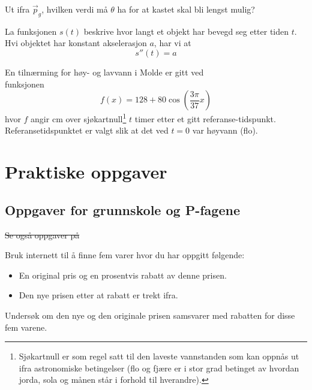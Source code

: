 Ut ifra $ \vec{p}_g $, hvilken verdi må $ \theta $ ha for at kastet skal bli lengst mulig?

La funksjonen $ s(t) $ beskrive hvor langt et objekt har bevegd seg etter tiden $ t $. Hvi objektet har konstant akselerasjon $ a $, har vi at
\[ s''(t)=a \] 
\newpage


\newpage
{}
En tilnærming for høy- og lavvann i Molde er gitt ved \\funksjonen 
\[ f(x)=128+80\cos\left(\frac{3\pi}{37}x\right) \]
hvor $ f $ angir cm over sjøkartnull\footnote{Sjøkartnull er som regel satt til den laveste vannstanden som kan oppnås ut ifra astronomiske betingelser (flo og fjære er i stor grad betinget av hvordan jorda, sola og månen står i forhold til hverandre).} $ t $ timer etter et gitt referanse-tidspunkt. Referansetidspunktet er valgt slik at det ved $ {t=0} $ var høyvann (flo). \os
{}


\section{Praktiske oppgaver}
\subsection*{Oppgaver for grunnskole og P-fagene}
\st{Se også oppgaver på }

Bruk internett til å finne fem varer hvor du har oppgitt følgende:
\begin{itemize}
	\item En original pris og en prosentvis rabatt av denne prisen.
	\item Den nye prisen etter at rabatt er trekt ifra.
\end{itemize}
Undersøk om den nye og den originale prisen samsvarer med rabatten for disse fem varene.

